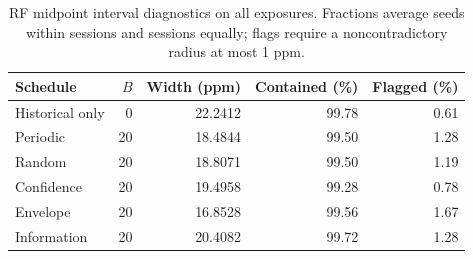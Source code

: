 \begin{table}[H]\centering\small
\caption{RF midpoint interval diagnostics on all exposures. Fractions average seeds within sessions and sessions equally; flags require a noncontradictory radius at most 1 ppm.}\label{tab:bounds}
\setlength{\tabcolsep}{4pt}\begin{tabular}{lrrrr}
\toprule
Schedule & $B$ & Width (ppm) & Contained (\%) & Flagged (\%) \\ \midrule
Historical only & 0 & 22.2412 & 99.78 & 0.61 \\
Periodic & 20 & 18.4844 & 99.50 & 1.28 \\
Random & 20 & 18.8071 & 99.50 & 1.19 \\
Confidence & 20 & 19.4958 & 99.28 & 0.78 \\
Envelope & 20 & 16.8528 & 99.56 & 1.67 \\
Information & 20 & 20.4082 & 99.72 & 1.28 \\
\bottomrule\end{tabular}\end{table}
